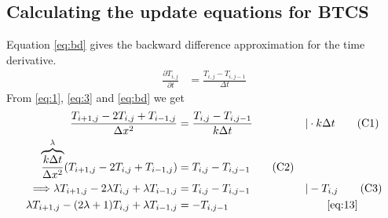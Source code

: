 \documentclass[a4paper]{article} %
\begin{document}
\begin{appendices}
\section{Calculating the update equations for BTCS}
\label{appendix:math3}

Equation \eqref{eq:bd} gives the backward difference approximation for the time derivative.
\begin{align}
\frac{\partial{T_{i,j}}}{\partial t} &= \frac{T_{i,j} - T_{i,j-1}}{\Delta t}\label{eq:bd}
\end{align}
From \eqref{eq:1}, \eqref{eq:3} and \eqref{eq:bd} we get
\begin{align*}
\frac{T_{i+1,j} - 2T_{i,j} + T_{i-1,j}}{\Delta x^2} &= \frac{T_{i,j} - T_{i,j-1}}{k\Delta t} &&| \cdot k\Delta t \tag*{(C1)}\\
\overbrace{\frac{k\Delta t}{\Delta x^2}}^{\lambda}(T_{i+1,j} - 2T_{i,j} + T_{i-1,j}) &= T_{i,j} - T_{i,j-1} \tag*{(C2)}\\
\Longrightarrow \lambda T_{i+1,j} - 2 \lambda T_{i,j} + \lambda T_{i-1,j} &= T_{i,j} - T_{i,j-1} &&| -T_{i,j} \tag*{(C3)}\\
\lambda T_{i+1,j} - (2 \lambda + 1) T_{i,j} + \lambda T_{i-1,j} &= - T_{i,j-1} && \tag*{\eqref{eq:13}} 
\end{align*}


\end{appendices}
\end{document}
